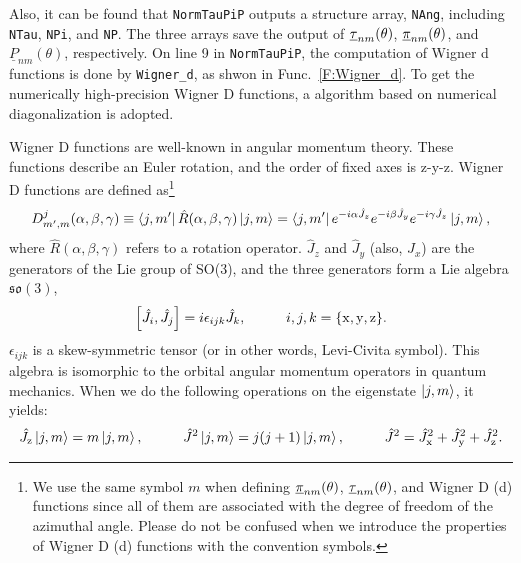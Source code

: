 \documentclass[journal=jacsat,manuscript=article,layout=traditional]{achemso}
\newcommand{\norF}[1]{\underline{\vb{#1}}}
\newcommand{\cfont}[1]{\texttt{#1}}
\begin{document}
Also, it can be found that \cfont{NormTauPiP} outputs a structure array, \cfont{NAng}, including \cfont{NTau}, \cfont{NPi}, and \cfont{NP}.
The three arrays save the output of $\norF{\tau}_{nm}(\theta)$, $\norF{\pi}_{nm}(\theta)$, and $\underline{P}_{nm}(\theta)$, respectively.
On line 9 in \cfont{NormTauPiP}, the computation of Wigner d functions is done by \cfont{Wigner\_d}, as shwon in Func.~\ref{F:Wigner_d}.
To get the numerically high-precision Wigner D functions, a algorithm based on numerical diagonalization is adopted\cite{feng2015high}.

\newpage
\noindent
Wigner D functions are well-known in angular momentum theory.
These functions describe an Euler rotation, and the order of fixed axes is z-y-z.
Wigner D functions are defined as\footnote{We use the same symbol $m$ when defining $\norF{\pi}_{nm}(\theta)$, $\norF{\tau}_{nm}(\theta)$, and Wigner D (d) functions since all of them are associated with the degree of freedom of the azimuthal angle. Please do not be confused when we introduce the properties of Wigner D (d) functions with the convention symbols.}
\begin{align}
    D_{m',m}^j(\alpha,\beta,\gamma) \equiv \bra{j,m'}\hat{R}(\alpha,\beta,\gamma)\ket{j,m}
    =\bra{j,m'}e^{-i\alpha \hat{J}_z}e^{-i\beta \hat{J}_y}e^{-i\gamma \hat{J}_z}\ket{j,m},
\end{align}
where $\hat{R}(\alpha,\beta,\gamma)$ refers to a rotation operator. $\hat{J}_z$ and $\hat{J}_y$ (also, $\hat{J}_x$) are the generators of the Lie group of SO(3), and the three generators form a Lie algebra $\mathfrak{so}(3)$, 
\begin{align}
    \left[ \hat{J}_i,\hat{J}_j \right] = i\epsilon_{ijk}\hat{J}_k,
    \hspace{1 cm}
    i,j,k = \{\mathrm{x,y,z}\}.
\end{align}
$\epsilon_{ijk}$ is a skew-symmetric tensor (or in other words, Levi-Civita symbol).
This algebra is isomorphic to the orbital angular momentum operators in quantum mechanics.
When we do the following operations on the eigenstate $\ket{j,m}$, it yields:
\begin{align}
    \hat{J}_\mathrm{z}\ket{j,m} = m\ket{j,m}, \hspace{1 cm}
    \hat{J}^2\ket{j,m} = j(j+1)\ket{j,m}, \hspace{1 cm} \hat{J}^2 = \hat{J}_\mathrm{x}^2+\hat{J}_\mathrm{y}^2+\hat{J}_\mathrm{z}^2.
\end{align}
\end{document}
